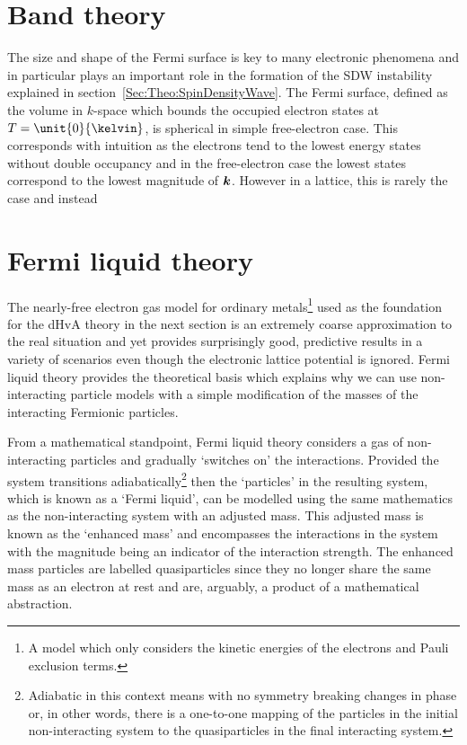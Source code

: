 
\section{Band theory}
    \label{Sec:Theo:BandTheory}

The size and shape of the Fermi surface is key to many electronic phenomena and in particular plays an important role in the formation of the \acf{SDW} instability explained in section~\ref{Sec:Theo:SpinDensityWave}. The Fermi surface, defined as the volume in $k$-space which bounds the occupied electron states at $T=\unit{0}{\kelvin}$, is spherical in simple free-electron case. This corresponds with intuition as the electrons tend to the lowest energy states without double occupancy and in the free-electron case the lowest states correspond to the lowest magnitude of $\boldsymbol{k}$. However in a lattice, this is rarely the case and instead  

\section{Fermi liquid theory}
    \label{Sec:Theo:FermiLiquidTheory}

The nearly-free electron gas model for ordinary metals\footnote{A model which only considers the kinetic energies of the electrons and Pauli exclusion terms.} used as the foundation for the \ac{dHvA} theory in the next section is an extremely coarse approximation to the real situation and yet provides surprisingly good, predictive results in a variety of scenarios even though the electronic lattice potential is ignored. Fermi liquid theory provides the theoretical basis which explains why we can use non-interacting particle models with a simple modification of the masses of the interacting Fermionic particles.

From a mathematical standpoint, Fermi liquid theory considers a gas of non-interacting particles and gradually `switches on' the interactions. Provided the system transitions adiabatically\footnote{Adiabatic in this context means with no symmetry breaking changes in phase or, in other words, there is a one-to-one mapping of the particles in the initial non-interacting system to the quasiparticles in the final interacting system.} then the `particles' in the resulting system, which is known as a `Fermi liquid', can be modelled using the same mathematics as the non-interacting system with an adjusted mass. This adjusted mass is known as the `enhanced mass' and encompasses the interactions in the system with the magnitude being an indicator of the interaction strength. The enhanced mass particles are labelled quasiparticles since they no longer share the same mass as an electron at rest and are, arguably, a product of a mathematical abstraction.

